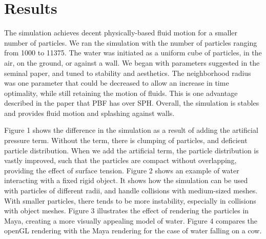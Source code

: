 \documentclass[conference]{IEEEtran}
\begin{document}
\section{Results}
The simulation achieves decent physically-based fluid motion for a smaller number of particles. We ran the simulation with the number of particles ranging from 1000 to 11375. The water was initiated as a uniform cube of particles, in the air, on the ground, or against a wall. We began with parameters suggested in the seminal paper, and tuned to stability and aesthetics. The neighborhood radius was one parameter that could be decreased to allow an increase in time optimality, while still retaining the motion of fluids. This is one advantage described in the paper that PBF has over SPH. Overall, the simulation is stables and provides fluid motion and splashing against walls. 

Figure 1 shows the difference in the simulation as a result of adding the artificial pressure term. Without the term, there is clumping of particles, and deficient particle distribution. When we add the artificial term, the particle distribution is vastly improved, such that the particles are compact without overlapping, providing the effect of surface tension. Figure 2 shows an example of water interacting with a fixed rigid object. It shows how the simulation can be used with particles of different radii, and handle collisions with medium-sized meshes. With smaller particles, there tends to be more instability, especially in collisions with object meshes. Figure 3 illustrates the effect of rendering the particles in Maya, creating a more visually appealing model of water. Figure 4 compares the openGL rendering with the Maya rendering for the case of water falling on a cow. 
\end{document}
